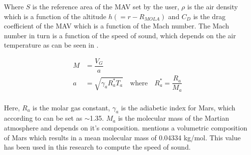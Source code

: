 

Where $S$ is the reference area of the \ac{MAV} set by the user, $\rho$ is the air density which is a function of the altitude $h\left(=r-R_{MOLA}\right)$ and $C_{D}$ is the drag coefficient of the \ac{MAV} which is a function of the Mach number. The Mach number in turn is a function of the speed of sound, which depends on the air temperature as can be seen in .





 \begin{equation} \label{eq:machAndSpeedOfSound}
\begin{split}
M &= \dfrac{V_{G}}{a} \\
a &= \sqrt{\gamma_{a}R_{a}^{*}T_{a}} \quad \text{where} \quad R_{a}^{*}=\dfrac{R_{a}}{M_{a}} \\
\end{split}
\end{equation}







Here, $R_{a}$ is the molar gas constant, $\gamma_{a}$ is the adiabetic index for Mars, which according to \cite{ho2002radio} can be set as $\sim$1.35. $M_{a}$ is the molecular mass of the Martian atmosphere and depends on it's composition. \cite{williams2015} mentions a volumetric composition of Mars which results in a mean molecular mass of 0.04334 kg/mol. This value has been used in this research to compute the speed of sound.\\

